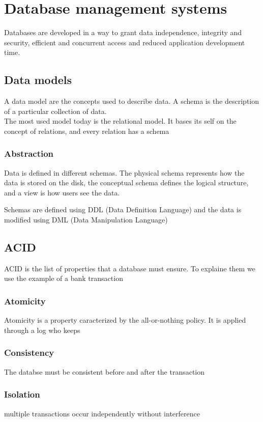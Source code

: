 \documentclass[12pt, a4paper]{article}
\begin{document}
\section{Database management systems}

Databases are developed in a way to grant data independence, integrity and security, efficient and concurrent
access and reduced application development time.

\subsection{Data models}
A data model are the concepts used to describe data. A schema is the description of a particular 
collection of data.\\The most used model today is the relational model. It bases its self on the concept 
of relations, and every relation has a schema

\subsubsection{Abstraction}
Data is defined in different schemas. The physical schema represents how the data is stored on the disk,
the conceptual schema defines the logical structure, and a view is how users see the data.

Schemas are defined using DDL (Data Definition Language) and the data is modified using DML (Data 
Manipulation Language)

\subsection{ACID}
ACID is the list of properties that a database must ensure. To explaine them we use the example of a 
bank transaction

\subsubsection{Atomicity}
Atomicity is a property caracterized by the all-or-nothing policy. It is applied through a log who keeps

\subsubsection{Consistency}
The databse must be consistent before and after the transaction

\subsubsection{Isolation}
multiple transactions occur independently without interference
\end{document}
